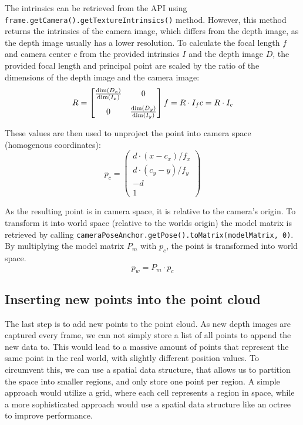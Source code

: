 The intrinsics can be retrieved from the API using \texttt{frame.getCamera().getTextureIntrinsics()} method.
However, this method returns the intrinsics of the camera image, which differs from the depth image, as the depth image usually has a lower resolution.
To calculate the focal length $f$ and camera center $c$ from the provided intrinsics $I$ and the depth image $D$,
the provided focal length and principal point are scaled by the ratio of the dimensions of the depth image and the camera image:
\begin{equation}
    R = \begin{bmatrix}
            \frac{\dim(D_x)}{\dim(I_x)} & 0\\[8pt]
            0 & \frac{\dim(D_y)}{\dim(I_y)}
    \end{bmatrix}\\
    f = R \cdot I_f \\
    c = R \cdot I_c
\end{equation}

These values are then used to unproject the point into camera space (homogenous coordinates):
\begin{equation}
    p_c = \begin{pmatrix}
              d \cdot (x - c_x) / f_x  \\
              d \cdot (c_y - y) / f_y \\
              -d                  \\
              1
    \end{pmatrix}
\end{equation}

As the resulting point is in camera space, it is relative to the camera's origin.
To transform it into world space (relative to the worlds origin) the model matrix is retrieved by calling
\texttt{cameraPoseAnchor.getPose().toMatrix(modelMatrix, 0)}.
By multiplying the model matrix $P_m$ with $p_c$, the point is transformed into world space.
\begin{equation}
    p_w = P_m \cdot p_c
\end{equation}


\subsection{Inserting new points into the point cloud}

The last step is to add new points to the point cloud.
As new depth images are captured every frame, we can not simply store a list of all points to append the new data to.
This would lead to a massive amount of points that represent the same point in the real world, with slightly different position values.
To circumvent this, we can use a spatial data structure, that allows us to partition the space into smaller regions, and only store one point per region.
A simple approach would utilize a grid, where each cell represents a region in space, while a more sophisticated approach
would use a spatial data structure like an octree to improve performance.

